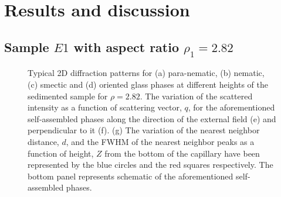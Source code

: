 \documentclass[aps,prl,preprint,superscriptaddress]{revtex4-1}
\begin{document}
\section{Results and discussion}
\subsection{Sample $E1$ with aspect ratio $\rho_1 = 2.82$}
\begin{figure}[t]
\caption{Typical 2D diffraction patterns for (a) para-nematic, (b) nematic, (c) smectic and (d) oriented glass phases at different heights of the sedimented sample for $\rho=2.82$. The variation of the scattered intensity as a function of scattering vector, $q$, for the aforementioned self-assembled phases along the direction of the external field (e) and perpendicular to it (f). (g) The variation of the nearest neighbor distance, $d$, and the FWHM of the nearest neighbor peaks as a function of height, $Z$ from the bottom of the capillary have been represented by the blue circles and the red squares respectively. The bottom panel represents schematic of the aforementioned self-assembled phases.}
\label{z_scan}
\end{figure} 
\end{document}
